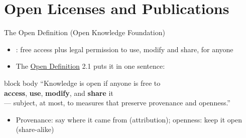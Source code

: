 \documentclass[aspectratio=169]{beamer}
\begin{document}
\section{Open Licenses and Publications}

\begin{frame}{The Open Definition  (Open Knowledge Foundation) }
\begin{itemize}
  \item {}: free access plus legal permission to use, modify and share, for anyone
  \item The \href{https://opendefinition.org/od/2.1/en/}{Open Definition} 2.1 puts it in one sentence:
\end{itemize}
\bigskip
\begin{center}
\begin{minipage}{0.85\textwidth}
\begin{beamercolorbox}[sep=1em,rounded=true,shadow=true]{block body}
  \centering\Large
  ``Knowledge is open if anyone is free to \\
  \textbf{access}, \textbf{use}, \textbf{modify}, and \textbf{share} it \\
  --- subject, at most, to measures
  that preserve provenance and openness.''
\end{beamercolorbox}
\end{minipage}
\end{center}
\bigskip
\begin{itemize}
  \item Provenance: say where it came from (attribution); openness: keep it open (share-alike)
\end{itemize}
\end{frame}
\end{document}
